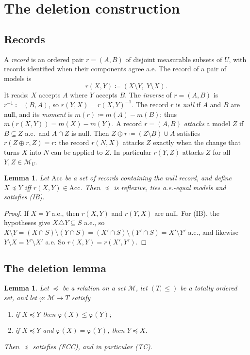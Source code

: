 \documentclass[11pt]{article}
\newcommand{\M}{\mathcal{M}}
\newcommand{\Acc}{\mathrm{Acc}}
\theoremstyle{plain}
\newtheorem{lemma}[theorem]{Lemma}
\theoremstyle{definition}
\theoremstyle{remark}
\begin{document}
\section{The deletion construction}\label{sec:deletion}

\subsection{Records}

A \emph{record} is an ordered pair $r=(A,B)$ of disjoint measurable subsets of $U$, with
records identified when their components agree a.e. The record of a pair of models is
\[
  r(X,Y)\coloneqq(X\setminus Y,\;Y\setminus X).
\]
It reads: $X$ accepts $A$ where $Y$ accepts $B$. The \emph{inverse} of $r=(A,B)$ is
$r^{-1}\coloneqq(B,A)$, so $r(Y,X)=r(X,Y)^{-1}$. The record $r$ is \emph{null} if $A$
and $B$ are null, and its \emph{moment} is $m(r)\coloneqq m(A)-m(B)$; thus $m(r(X,Y))=
m(X)-m(Y)$. A record $r=(A,B)$ \emph{attacks} a model $Z$ if $B\subseteq Z$ a.e.\ and
$A\cap Z$ is null. Then $Z\oplus r\coloneqq(Z\setminus B)\cup A$ satisfies $r(Z\oplus r,
Z)=r$: the record $r(N,X)$ attacks $Z$ exactly when the change that turns $X$ into $N$
can be applied to $Z$. In particular $r(Y,Z)$ attacks $Z$ for all $Y,Z\in\M_U$.

\begin{lemma}\label{lem:record}
Let $\Acc$ be a set of records containing the null record, and define $X\preceq Y$ iff
$r(X,Y)\in\Acc$. Then $\preceq$ is reflexive, ties a.e.-equal models and satisfies (IB).
\end{lemma}

\begin{proof}
If $X=Y$ a.e., then $r(X,Y)$ and $r(Y,X)$ are null. For (IB), the hypotheses give
$X\triangle Y\subseteq S$ a.e., so $X\setminus Y=(X\cap S)\setminus(Y\cap S)=(X'\cap S)
\setminus(Y'\cap S)=X'\setminus Y'$ a.e., and likewise $Y\setminus X=Y'\setminus X'$
a.e. So $r(X,Y)=r(X',Y')$.
\end{proof}

\subsection{The deletion lemma}

\begin{lemma}\label{lem:deletion}
Let $\preceq$ be a relation on a set $\M$, let $(T,\le)$ be a totally ordered set, and
let $\varphi:\M\to T$ satisfy
\begin{enumerate}[label=(\alph*)]
  \item if $X\preceq Y$ then $\varphi(X)\le\varphi(Y)$;
  \item if $X\preceq Y$ and $\varphi(X)=\varphi(Y)$, then $Y\preceq X$.
\end{enumerate}
Then $\preceq$ satisfies (FCC), and in particular (TC).
\end{lemma}
\end{document}
